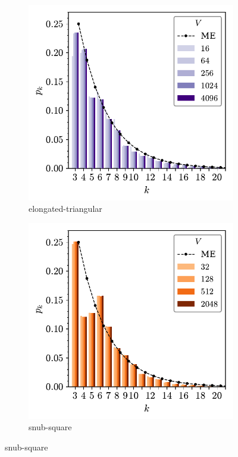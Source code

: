 \begin{figure}[btp]
     \vspace{0.5cm}
     \begin{subfigure}[b]{0.40\textwidth}
         \centering
         \includegraphics[width=\textwidth]{./figures/procrystals/elong3_pk.pdf}
         \caption{elongated\--triangular}
         \label{fig:pro3pkc}
     \end{subfigure}
          \hfill
     \begin{subfigure}[b]{0.40\textwidth}
         \centering
         \includegraphics[width=\textwidth]{./figures/procrystals/snub3_pk.pdf}
         \caption{snub\--square}
         \label{fig:pro3pkd}
     \end{subfigure}
     \hfill
     

\end{figure}
